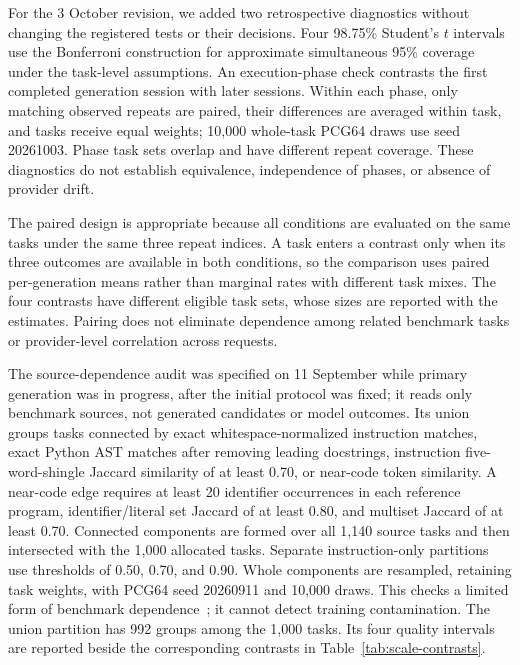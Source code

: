 For the 3 October revision, we added two retrospective diagnostics without changing the registered tests or their decisions. Four 98.75\% Student's $t$ intervals use the Bonferroni construction for approximate simultaneous 95\% coverage under the task-level assumptions. An execution-phase check contrasts the first completed generation session with later sessions. Within each phase, only matching observed repeats are paired, their differences are averaged within task, and tasks receive equal weights; 10,000 whole-task PCG64 draws use seed 20261003. Phase task sets overlap and have different repeat coverage. These diagnostics do not establish equivalence, independence of phases, or absence of provider drift.

The paired design is appropriate because all conditions are evaluated on the same tasks under the same three repeat indices. A task enters a contrast only when its three outcomes are available in both conditions, so the comparison uses paired per-generation means rather than marginal rates with different task mixes. The four contrasts have different eligible task sets, whose sizes are reported with the estimates. Pairing does not eliminate dependence among related benchmark tasks or provider-level correlation across requests.

The source-dependence audit was specified on 11 September while primary generation was in progress, after the initial protocol was fixed; it reads only benchmark sources, not generated candidates or model outcomes. Its union groups tasks connected by exact whitespace-normalized instruction matches, exact Python AST matches after removing leading docstrings, instruction five-word-shingle Jaccard similarity of at least 0.70, or near-code token similarity. A near-code edge requires at least 20 identifier occurrences in each reference program, identifier/literal set Jaccard of at least 0.80, and multiset Jaccard of at least 0.70. Connected components are formed over all 1,140 source tasks and then intersected with the 1,000 allocated tasks. Separate instruction-only partitions use thresholds of 0.50, 0.70, and 0.90. Whole components are resampled, retaining task weights, with PCG64 seed 20260911 and 10,000 draws. This checks a limited form of benchmark dependence~\cite{allamanis2019duplication,mackinnon2023clusters}; it cannot detect training contamination. The union partition has 992 groups among the 1,000 tasks. Its four quality intervals are reported beside the corresponding contrasts in Table~\ref{tab:scale-contrasts}.


